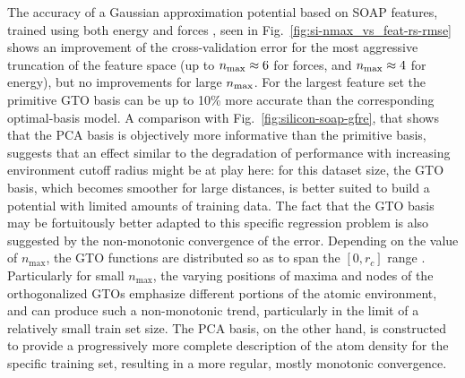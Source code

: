 The accuracy of a Gaussian approximation potential based on SOAP features, trained using both energy and forces
, seen in Fig.~\ref{fig:si-nmax_vs_feat-rs-rmse} shows an improvement of the cross-validation error for the most aggressive truncation of the feature space (up to $n_\mathrm{max}\approx 6$ for forces, and $n_\mathrm{max}\approx 4$ for energy), but no improvements for large $n_\mathrm{max}$. 
For the largest feature set the primitive GTO basis can be up to 10\% more accurate than the corresponding optimal-basis model.
A comparison with Fig.~\ref{fig:silicon-soap-gfre}, that shows that the PCA basis is objectively more informative than the primitive basis, suggests that an effect similar to the degradation of performance with increasing environment cutoff radius might be at play here: for this dataset size, the GTO basis, which becomes smoother for large distances, is better suited to build a potential with limited amounts of training data.
The fact that the GTO basis may be fortuitously better adapted to this specific regression problem is also suggested by the non-monotonic convergence of the error. Depending on the value of $n_\text{max}$, the GTO functions are distributed so as to span the $[0, r_c]$ range
.
Particularly for small $n_\text{max}$, the varying positions of maxima and nodes of the orthogonalized GTOs emphasize different portions of the atomic environment, and can produce such a non-monotonic trend, particularly in the limit of a relatively small train set size. 
The PCA basis, on the other hand, is constructed to provide a progressively more complete description of the atom density for the specific training set, resulting in a more regular, mostly monotonic convergence.

